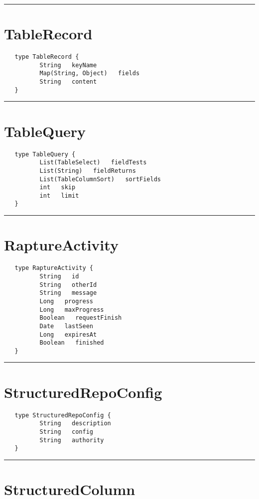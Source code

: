 \rule{15cm}{2pt}
\section{TableRecord}
\label{type:TableRecord}

\begin{verbatim}
   type TableRecord {
          String   keyName
          Map(String, Object)   fields
          String   content
   }
\end{verbatim}

\rule{15cm}{2pt}
\section{TableQuery}
\label{type:TableQuery}

\begin{verbatim}
   type TableQuery {
          List(TableSelect)   fieldTests
          List(String)   fieldReturns
          List(TableColumnSort)   sortFields
          int   skip
          int   limit
   }
\end{verbatim}

\rule{15cm}{2pt}
\section{RaptureActivity}
\label{type:RaptureActivity}

\begin{verbatim}
   type RaptureActivity {
          String   id
          String   otherId
          String   message
          Long   progress
          Long   maxProgress
          Boolean   requestFinish
          Date   lastSeen
          Long   expiresAt
          Boolean   finished
   }
\end{verbatim}

\rule{15cm}{2pt}
\section{StructuredRepoConfig}
\label{type:StructuredRepoConfig}

\begin{verbatim}
   type StructuredRepoConfig {
          String   description
          String   config
          String   authority
   }
\end{verbatim}

\rule{15cm}{2pt}
\section{StructuredColumn}
\label{type:StructuredColumn}

